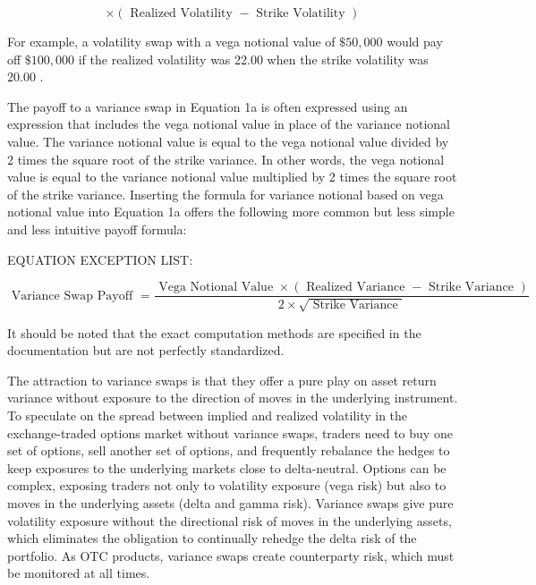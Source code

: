 \documentclass[11pt]{article}
\begin{document}
\begin{equation*}
\times(\text { Realized Volatility }- \text { Strike Volatility }) \tag{1b}
\end{equation*}


For example, a volatility swap with a vega notional value of $\$ 50,000$ would pay off $\$ 100,000$ if the realized volatility was 22.00 when the strike volatility was 20.00 .

The payoff to a variance swap in Equation 1a is often expressed using an expression that includes the vega notional value in place of the variance notional value. The variance notional value is equal to the vega notional value divided by 2 times the square root of the strike variance. In other words, the vega notional value is equal to the variance notional value multiplied by 2 times the square root of the strike variance. Inserting the formula for variance notional based on vega notional value into Equation 1a offers the following more common but less simple and less intuitive payoff formula:

EQUATION EXCEPTION LIST:

$$
\text { Variance Swap Payoff }=\frac{\text { Vega Notional Value } \times(\text { Realized Variance }- \text { Strike Variance })}{2 \times \sqrt{\text { Strike Variance }}}
$$

It should be noted that the exact computation methods are specified in the documentation but are not perfectly standardized.

The attraction to variance swaps is that they offer a pure play on asset return variance without exposure to the direction of moves in the underlying instrument. To speculate on the spread between implied and realized volatility in the exchange-traded options market without variance swaps, traders need to buy one set of options, sell another set of options, and frequently rebalance the hedges to keep exposures to the underlying markets close to delta-neutral. Options can be complex, exposing traders not only to volatility exposure (vega risk) but also to moves in the underlying assets (delta and gamma risk). Variance swaps give pure volatility exposure without the directional risk of moves in the underlying assets, which eliminates the obligation to continually rehedge the delta risk of the portfolio. As OTC products, variance swaps create counterparty risk, which must be monitored at all times.
\end{document}
